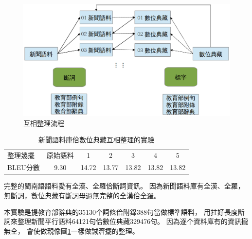 \begin{figure}
\centerline{\includegraphics[keepaspectratio,width=40em]{圖/互相整理架構}}
\caption{互相整理流程}
\label{圖：互相整理架構}
\end{figure}

\begin{table}
\caption{新聞語料庫佮數位典藏互相整理的實驗}
\label{表：互相整理實驗}
\centering
\begin{tabular}{lcccccc}
整理幾擺 & 原始語料 & 1 & 2 & 3 & 4 & 5\\
BLEU分數 & 9.30 & 14.72 & 13.77 & 13.82 & 13.82 & 13.82\\
\end{tabular}
\end{table}



完整的閩南語語料愛有全漢、全羅佮斷詞資訊。
因為新聞語料庫有全漢、全羅，無斷詞，數位典藏有斷詞毋過無完整的全漢佮全羅。


本實驗是提教育部辭典的35130个詞條佮附錄388句當做標準語料，
用拄好長度斷詞來整理新聞平行語料64121句佮數位典藏329476句。
因為逐个資料庫有的資訊攏無仝，
會使做親像圖\ref{圖：互相整理架構}一樣做誠濟擺的整理。


